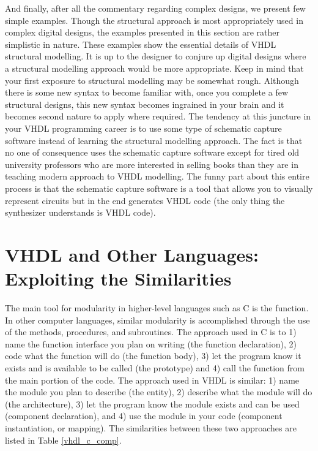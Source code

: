 And finally, after all the commentary regarding complex designs, we present few simple examples. Though the structural approach is most appropriately used in complex digital designs, the examples presented in this section are rather simplistic in nature. These examples show the essential details of VHDL structural modelling. It is up to the designer to conjure up digital designs where a structural modelling approach would be more appropriate. Keep in mind that your first exposure to structural modelling may be somewhat rough. Although there is some new syntax to become familiar with, once you complete a few structural designs, this new syntax becomes ingrained in your brain and it becomes second nature to apply where required. The tendency at this juncture in your VHDL programming career is to use some type of schematic capture software instead of learning the structural modelling approach. The fact is that no one of consequence uses the schematic capture software except for tired old university professors who are more interested in selling books than they are in teaching modern approach to VHDL modelling. The funny part about this entire process is that the schematic capture software is a tool that allows you to visually represent circuits but in the end generates VHDL code (the only thing the synthesizer understands is VHDL code).

\section{VHDL and Other Languages: Exploiting the Similarities}
The main tool for modularity in higher-level languages such as C is the function. In other computer languages, similar modularity is accomplished through the use of the methods, procedures, and subroutines. The approach used in C is to 1) name the function interface you plan on writing (the function declaration), 2) code what the function will do (the function body), 3) let the program know it exists and is available to be called (the prototype) and 4) call the function from the main portion of the code. The approach used in VHDL is similar: 1) name the module you plan to describe (the entity), 2) describe what the module will do (the architecture), 3) let the program know the module exists and can be used (component declaration), and 4) use the module in your code (component instantiation, or mapping). The similarities between these two approaches are listed in Table \ref{vhdl_c_comp}.

